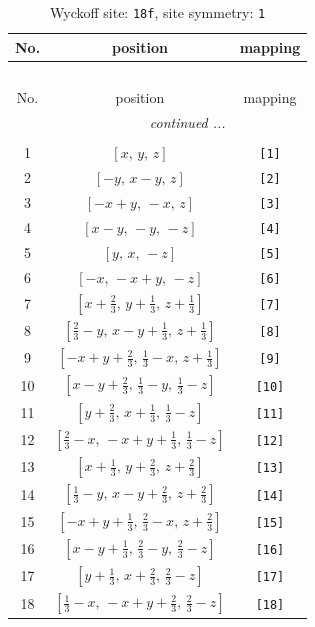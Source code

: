 \documentclass[fleqn,8pt]{jsarticle}
\begin{document}
\begin{longtable}{ccc}
\caption{Wyckoff site: {\tt 18f}, site symmetry: {\tt 1}}
 \\
 \hline \hline
No. & position & mapping \\ \hline \endfirsthead

\multicolumn{2}{l}{\tablename\ \thetable{}} \\
 \hline \hline
No. & position & mapping \\ \hline \endhead

 \hline \hline
\multicolumn{2}{r}{\footnotesize\it continued ...} \\ \endfoot

 \hline \hline
\multicolumn{2}{r}{} \\ \endlastfoot

1 & $\left[ x,\, y,\, z \right]$ & {\tt [1]} \\ \hline
2 & $\left[ - y,\, x - y,\, z \right]$ & {\tt [2]} \\ \hline
3 & $\left[ - x + y,\, - x,\, z \right]$ & {\tt [3]} \\ \hline
4 & $\left[ x - y,\, - y,\, - z \right]$ & {\tt [4]} \\ \hline
5 & $\left[ y,\, x,\, - z \right]$ & {\tt [5]} \\ \hline
6 & $\left[ - x,\, - x + y,\, - z \right]$ & {\tt [6]} \\ \hline
7 & $\left[ x + \frac{2}{3},\, y + \frac{1}{3},\, z + \frac{1}{3} \right]$ & {\tt [7]} \\ \hline
8 & $\left[ \frac{2}{3} - y,\, x - y + \frac{1}{3},\, z + \frac{1}{3} \right]$ & {\tt [8]} \\ \hline
9 & $\left[ - x + y + \frac{2}{3},\, \frac{1}{3} - x,\, z + \frac{1}{3} \right]$ & {\tt [9]} \\ \hline
10 & $\left[ x - y + \frac{2}{3},\, \frac{1}{3} - y,\, \frac{1}{3} - z \right]$ & {\tt [10]} \\ \hline
11 & $\left[ y + \frac{2}{3},\, x + \frac{1}{3},\, \frac{1}{3} - z \right]$ & {\tt [11]} \\ \hline
12 & $\left[ \frac{2}{3} - x,\, - x + y + \frac{1}{3},\, \frac{1}{3} - z \right]$ & {\tt [12]} \\ \hline
13 & $\left[ x + \frac{1}{3},\, y + \frac{2}{3},\, z + \frac{2}{3} \right]$ & {\tt [13]} \\ \hline
14 & $\left[ \frac{1}{3} - y,\, x - y + \frac{2}{3},\, z + \frac{2}{3} \right]$ & {\tt [14]} \\ \hline
15 & $\left[ - x + y + \frac{1}{3},\, \frac{2}{3} - x,\, z + \frac{2}{3} \right]$ & {\tt [15]} \\ \hline
16 & $\left[ x - y + \frac{1}{3},\, \frac{2}{3} - y,\, \frac{2}{3} - z \right]$ & {\tt [16]} \\ \hline
17 & $\left[ y + \frac{1}{3},\, x + \frac{2}{3},\, \frac{2}{3} - z \right]$ & {\tt [17]} \\ \hline
18 & $\left[ \frac{1}{3} - x,\, - x + y + \frac{2}{3},\, \frac{2}{3} - z \right]$ & {\tt [18]} \\
\end{longtable}
\end{document}
